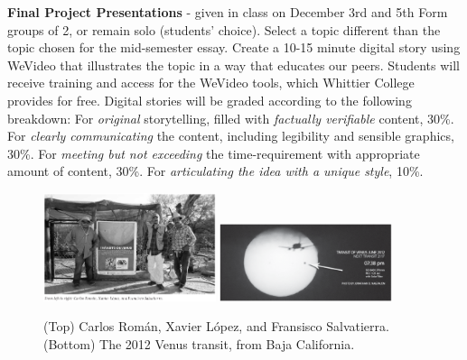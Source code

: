 \documentclass[10pt]{article}
\begin{document}
\begin{outline}[enumerate]
\1 \textbf{Final Project Presentations} - given in class on December 3rd and 5th
\2 Form groups of 2, or remain solo (students' choice).
\2 Select a topic different than the topic chosen for the mid-semester essay.
\2 Create a 10-15 minute digital story using WeVideo that illustrates the topic in a way that educates our peers.
\2 Students will receive training and access for the WeVideo tools, which Whittier College provides for free.
\2 Digital stories will be graded according to the following breakdown:
\3 For \textit{original} storytelling, filled with \textit{factually verifiable} content, 30\%.
\3 For \textit{clearly communicating} the content, including legibility and sensible graphics, 30\%.
\3 For \textit{meeting but not exceeding} the time-requirement with appropriate amount of content, 30\%.
\3 For \textit{articulating the idea with a unique style}, 10\%.
\end{outline}
\begin{figure}[hb]
\centering
\includegraphics[width=0.45\textwidth]{figures/roman_lopez_salvatierra.png}
\includegraphics[width=0.45\textwidth]{figures/venus.png}
\caption{\label{fig:franklin2} (Top) Carlos Rom\'{a}n, Xavier L\'{o}pez, and Fransisco Salvatierra. (Bottom) The 2012 Venus transit, from Baja California.}
\end{figure}
\end{document}
